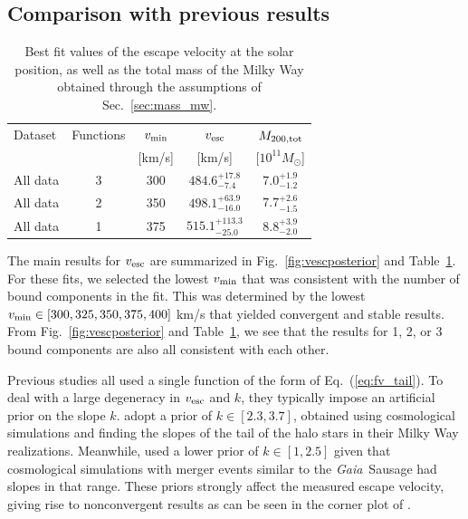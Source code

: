 \documentclass[twocolumn,preprintnumbers]{aastex63}
\DeclareRobustCommand{\Sec}[1]{Sec.~\ref{#1}}
\DeclareRobustCommand{\Tab}[1]{Table~\ref{#1}}
\DeclareRobustCommand{\Fig}[1]{Fig.~\ref{#1}}
\DeclareRobustCommand{\Eq}[1]{Eq.~(\ref{#1})}
\newcommand{\Gaia}{\textit{Gaia}~}
\newcommand{\vesc}{v_{\rm esc}}
\newcommand{\vmin}{v_{\rm min}}
\begin{document}
\subsection{Comparison with previous results \label{sec:fitsummary} }


\begin{table}[t]
\begin{center}
\begin{tabular}{|l| c | c | c | c |}
\hline 
Dataset & Functions & $\vmin$ & $\vesc$  & $M_{\rm{200, \rm{tot}}} $ \\
 &  & [km/s] & [km/s] &  $[10^{11} M_{\odot}$] \\
 \hline 
 \hline 
All data & 3 & 300 & $484.6^{+17.8}_{-7.4}$ & $7.0 ^{+1.9}_{-1.2}$ \\
All data & 2 & 350 & $498.1^{+63.9}_{-16.0}$ & $7.7 ^{+2.6}_{-1.5}$ \\
All data & 1 & 375 & $515.1^{+113.3}_{-25.0}$ & $8.8 ^{+3.9}_{-2.0}$ \\
 \hline
\end{tabular}
\end{center}
\caption{\label{tab:results} Best fit values of the escape velocity at the solar position, as well as the total mass of the Milky Way obtained through the assumptions of \Sec{sec:mass_mw}. }
\end{table}

The main results for $\vesc$ are summarized in \Fig{fig:vescposterior} and \Tab{tab:results}. For these fits, we selected the lowest $\vmin$ that was consistent with the number of bound components in the fit. This was determined by the lowest $\vmin \in [300, 325,350,375,400]$ km/s  that yielded convergent and stable results. From \Fig{fig:vescposterior} and \Tab{tab:results}, we see that the results for 1, 2, or 3 bound components are also all consistent with each other.

Previous studies all used a single function of the form of \Eq{eq:fv_tail}. To deal with a large degeneracy in $\vesc$ and $k$, they typically impose an artificial prior on the slope $k$. \cite{2014A&A...562A..91P,2018A&A...616L...9M} adopt a prior of $k \in [2.3, 3.7]$, obtained using cosmological simulations and finding the slopes of the tail of the halo stars in their Milky Way realizations. Meanwhile, \cite{2019arXiv190102016D} used a lower prior of $k \in [1,2.5]$ given that cosmological simulations with merger events similar to the \Gaia Sausage had slopes in that range. These priors strongly affect the measured escape velocity, giving rise to nonconvergent results as can be seen in the corner plot of \cite{2019arXiv190102016D}. 
\end{document}
